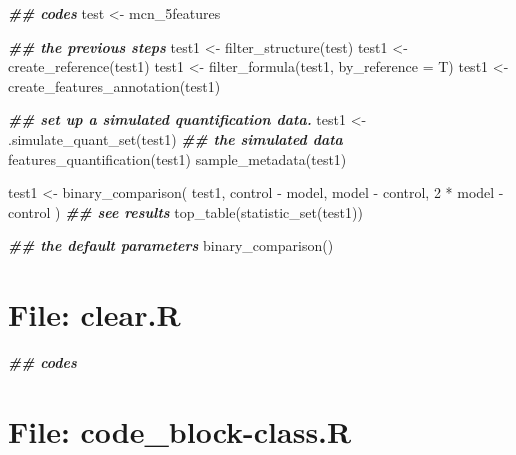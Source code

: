 \documentclass[
]{article}
\newenvironment{Shaded}{\begin{snugshade}}{\end{snugshade}}
\newcommand{\AttributeTok}[1]{\textcolor[rgb]{0.77,0.63,0.00}{#1}}
\newcommand{\DecValTok}[1]{\textcolor[rgb]{0.00,0.00,0.81}{#1}}
\newcommand{\DocumentationTok}[1]{\textcolor[rgb]{0.56,0.35,0.01}{\textbf{\textit{#1}}}}
\newcommand{\FunctionTok}[1]{\textcolor[rgb]{0.00,0.00,0.00}{#1}}
\newcommand{\NormalTok}[1]{#1}
\newcommand{\OtherTok}[1]{\textcolor[rgb]{0.56,0.35,0.01}{#1}}
\newcommand{\SpecialCharTok}[1]{\textcolor[rgb]{0.00,0.00,0.00}{#1}}
\begin{document}
\begin{Shaded}
\begin{Highlighting}[]
\DocumentationTok{\#\# codes}
\NormalTok{test }\OtherTok{\textless{}{-}}\NormalTok{ mcn\_5features}

\DocumentationTok{\#\# the previous steps}
\NormalTok{test1 }\OtherTok{\textless{}{-}} \FunctionTok{filter\_structure}\NormalTok{(test)}
\NormalTok{test1 }\OtherTok{\textless{}{-}} \FunctionTok{create\_reference}\NormalTok{(test1)}
\NormalTok{test1 }\OtherTok{\textless{}{-}} \FunctionTok{filter\_formula}\NormalTok{(test1, }\AttributeTok{by\_reference =}\NormalTok{ T)}
\NormalTok{test1 }\OtherTok{\textless{}{-}} \FunctionTok{create\_features\_annotation}\NormalTok{(test1)}

\DocumentationTok{\#\# set up a simulated quantification data.}
\NormalTok{test1 }\OtherTok{\textless{}{-}} \FunctionTok{.simulate\_quant\_set}\NormalTok{(test1)}
\DocumentationTok{\#\# the simulated data}
\FunctionTok{features\_quantification}\NormalTok{(test1)}
\FunctionTok{sample\_metadata}\NormalTok{(test1)}

\NormalTok{test1 }\OtherTok{\textless{}{-}} \FunctionTok{binary\_comparison}\NormalTok{(}
\NormalTok{  test1, control }\SpecialCharTok{{-}}\NormalTok{ model,}
\NormalTok{  model }\SpecialCharTok{{-}}\NormalTok{ control, }\DecValTok{2} \SpecialCharTok{*}\NormalTok{ model }\SpecialCharTok{{-}}\NormalTok{ control}
\NormalTok{)}
\DocumentationTok{\#\# see results}
\FunctionTok{top\_table}\NormalTok{(}\FunctionTok{statistic\_set}\NormalTok{(test1))}

\DocumentationTok{\#\# the default parameters}
\FunctionTok{binary\_comparison}\NormalTok{()}
\end{Highlighting}
\end{Shaded}

\hypertarget{file-clear.r}{%
\section{File: clear.R}\label{file-clear.r}}

\begin{Shaded}
\begin{Highlighting}[]
\DocumentationTok{\#\# codes}
\end{Highlighting}
\end{Shaded}

\hypertarget{file-code_block-class.r}{%
\section{File: code\_block-class.R}\label{file-code_block-class.r}}
\end{document}
